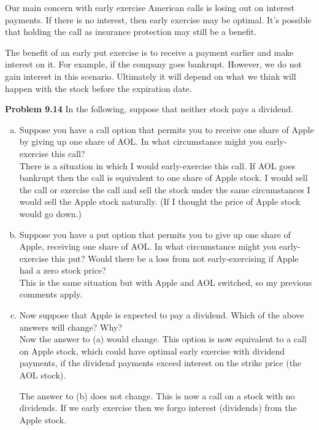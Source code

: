 \documentclass[12pt]{article}
\newcommand{\problem}[1]{\bigskip \noindent \textbf{Problem #1}}
\theoremstyle{plain}
\begin{document}
Our main concern with early exercise American calls is losing out on interest payments. If there is no interest, then early exercise may be optimal. It's possible that holding the call as insurance protection may still be a benefit.

The benefit of an early put exercise is to receive a payment earlier and make interest on it. For example, if the company goes bankrupt. However, we do not gain interest in this scenario. Ultimately it will depend on what we think will happen with the stock before the expiration date.

\problem{9.14} In the following, suppose that neither stock pays a dividend.
\begin{enumerate}[(a)]
\item Suppose you have a call option that permits you to receive one share of Apple by giving up one share of AOL. In what circumstance might you early-exercise this call?\\

There is a situation in which I would early-exercise this call. If AOL goes bankrupt then the call is equivalent to one share of Apple stock. I would sell the call or exercise the call and sell the stock under the same circumstances I would sell the Apple stock naturally. (If I thought the price of Apple stock would go down.)

\item Suppose you have a put option that permits you to give up one share of Apple, receiving one share of AOL. In what circumstance might you early-exercise this put? Would there be a loss from not early-exercising if Apple had a zero stock price?\\

This is the same situation but with Apple and AOL switched, so my previous comments apply.

\item Now suppose that Apple is expected to pay a dividend. Which of the above answers will change? Why?\\

Now the answer to (a) would change. This option is now equivalent to a call on Apple stock, which could have optimal early exercise with dividend payments, if the dividend payments exceed interest on the strike price (the AOL stock).

The answer to (b) does not change. This is now a call on a stock with no dividends. If we early exercise then we forgo interest (dividends) from the Apple stock.
\end{enumerate}
\end{document}
